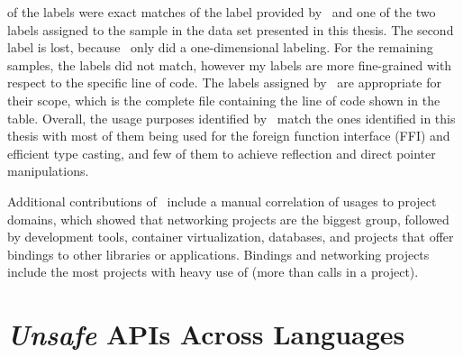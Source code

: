 

 of the labels were exact matches of the label provided by~\cite{costa2020} and one of the two labels
assigned to the sample in the data set presented in this thesis.
The second label is lost, because~\cite{costa2020} only did a one-dimensional labeling.
For the remaining  samples, the labels did not match, however my labels are more fine-grained with respect
to the specific line of code.
The labels assigned by~\cite{costa2020} are appropriate for their scope, which is the complete file containing the line
of code shown in the table.
Overall, the usage purposes identified by~\cite{costa2020} match the ones identified in this thesis with most of them
being used for the foreign function interface (\acrshort{FFI}) and efficient type casting, and few of them to achieve
reflection and direct pointer manipulations.

Additional contributions of~\cite{costa2020} include a manual correlation of \unsafe{} usages to project domains, which
showed that networking projects are the biggest group, followed by development tools, container virtualization,
databases, and projects that offer bindings to other libraries or applications.
Bindings and networking projects include the most projects with heavy use of \unsafe{} (more than  calls
in a project).



\section{\textit{Unsafe} APIs Across Languages}\label{sec:related-work:unsafe-across-languages}

